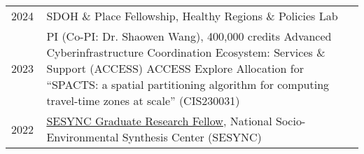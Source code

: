 \documentclass{acmcv}
\begin{document}

\begin{longtable}{p{0.1\linewidth} p{0.9\linewidth}}
    2024 & SDOH \& Place Fellowship, Healthy Regions \& Policies Lab \\

    2023 & PI (Co-PI: Dr. Shaowen Wang), 400,000 credits \newline Advanced Cyberinfrastructure Coordination Ecosystem: Services \& Support (ACCESS) \newline ACCESS Explore Allocation for “SPACTS: a spatial partitioning algorithm for computing travel-time zones at scale” (CIS230031) \\


    2022 & \href{https://www.sesync.org/project/graduate-pursuits-request-for-proposals/financial-opacity-and-challenges-to-forest}{SESYNC Graduate Research Fellow}, National Socio-Environmental Synthesis Center (SESYNC)\\

\end{longtable}


\end{document}
